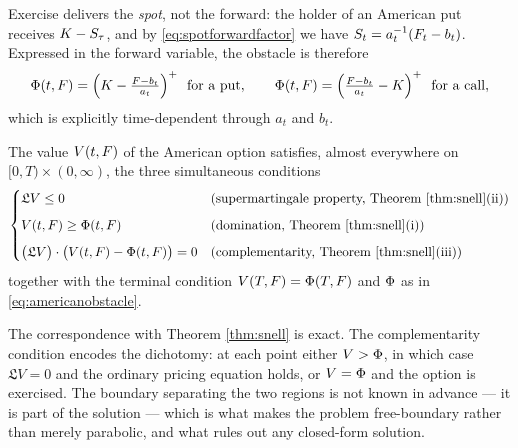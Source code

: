 Exercise delivers the \emph{spot}, not the forward: the holder of an American put
receives $K - S_\tau$, and by \eqref{eq:spotforwardfactor} we have
$S_t = a_t^{-1}(F_t - b_t)$. Expressed in the forward variable, the obstacle is therefore
\begin{equation}\label{eq:americanobstacle}
\PayoffFn(t,\Fwd) = \Bigl(\Strike - \tfrac{\Fwd - b_t}{a_t}\Bigr)^{+} \ \text{ for a put}, \qquad
\PayoffFn(t,\Fwd) = \Bigl(\tfrac{\Fwd - b_t}{a_t} - \Strike\Bigr)^{+} \ \text{ for a call},
\end{equation}
which is explicitly time-dependent through $a_t$ and $b_t$.


\begin{theorem}\label{thm:LCP}
The value $V(t,F)$ of the American option satisfies, almost everywhere on 
$[0,T)\times(0,\infty)$, the three simultaneous conditions
\begin{equation}\label{eq:LCP_American}
    \begin{cases}
        \mathfrak{L}V \le 0 & \text{(supermartingale property, Theorem \ref{thm:snell}(ii))} \\[6pt]
        V(t, F) \ge \Phi(t,F) & \text{(domination, Theorem \ref{thm:snell}(i))} \\[6pt]
        \bigl(\mathfrak{L}V\bigr) \cdot \bigl(V(t, F) - \Phi(t,F)\bigr) = 0 & \text{(complementarity, Theorem \ref{thm:snell}(iii))}
    \end{cases}
\end{equation}
together with the terminal condition $V(T,F) = \Phi(T,F)$ and $\Phi$ as in 
\eqref{eq:americanobstacle}. \qedopentext
\end{theorem}

The correspondence with Theorem \ref{thm:snell} is exact. The complementarity condition encodes the dichotomy: 
at each point either $V > \Phi$, in which case $\mathfrak{L}V=0$ and the ordinary pricing 
equation holds, or $V = \Phi$ and the option is exercised. The boundary separating the two 
regions is not known in advance --- it is part of the solution --- which is what makes the problem 
free-boundary rather than merely parabolic, and what rules out any closed-form solution.

